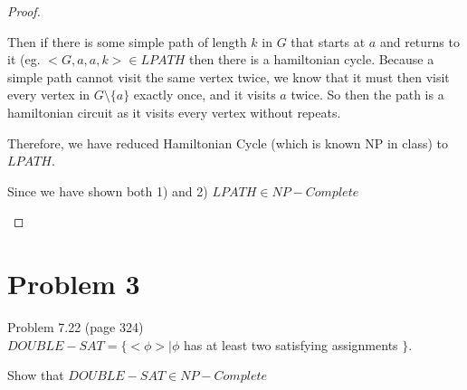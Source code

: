 \documentclass[11pt]{article}
\begin{document}
\begin{proof}
\begin{enumerate}[label=\alph*)]
\begin{enumerate}[label=\arabic*)]
Then if there is some simple path of length $k$ in $G$ that starts at $a$ and returns to it (eg. $<G, a, a, k> \in LPATH$ then there is a hamiltonian cycle. Because a simple path cannot visit the same vertex twice, we know that it must then visit every vertex in $G \setminus \{a\}$ exactly once, and it visits $a$ twice. So then the path is a hamiltonian circuit as it visits every vertex without repeats.

Therefore, we have reduced Hamiltonian Cycle (which is known NP in class) to $LPATH$.

\end{enumerate}

Since we have shown both 1) and 2) $LPATH \in NP-Complete$


\end{enumerate}

\end{proof}




\newpage
\section*{Problem 3}

Problem 7.22 (page 324)\\
$DOUBLE-SAT = \{<\phi> | \phi$ has at least two satisfying assignments $\}$.

Show that $DOUBLE-SAT \in NP-Complete$
\end{document}
